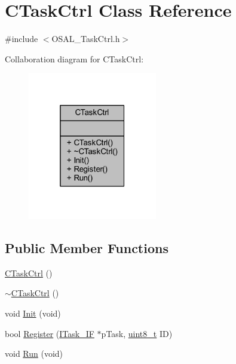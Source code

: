 \hypertarget{class_c_task_ctrl}{}\section{C\+Task\+Ctrl Class Reference}
\label{class_c_task_ctrl}


{\ttfamily \#include $<$O\+S\+A\+L\+\_\+\+Task\+Ctrl.\+h$>$}



Collaboration diagram for C\+Task\+Ctrl\+:\nopagebreak
\begin{figure}[H]
\begin{center}
\leavevmode
\includegraphics[width=160pt]{class_c_task_ctrl__coll__graph}
\end{center}
\end{figure}
\subsection*{Public Member Functions}
\begin{DoxyCompactItemize}
\item 
\mbox{\hyperlink{class_c_task_ctrl_a4d459479b49c5d6e1d07e9306748abe3}{C\+Task\+Ctrl}} ()
\item 
\mbox{\hyperlink{class_c_task_ctrl_a525a2b4438270d4ea5fce41e646c5b17}{$\sim$\+C\+Task\+Ctrl}} ()
\item 
void \mbox{\hyperlink{class_c_task_ctrl_a12ec6e8d4a490eba9ebdf22d32cf292b}{Init}} (void)
\item 
bool \mbox{\hyperlink{class_c_task_ctrl_a20457bd4d4a033c8aeeb44e9d4dc3c7c}{Register}} (\mbox{\hyperlink{class_i_task___i_f}{I\+Task\+\_\+\+IF}} $\ast$p\+Task, \mbox{\hyperlink{_a_d_a_s___types_8h_aba7bc1797add20fe3efdf37ced1182c5}{uint8\+\_\+t}} ID)
\item 
void \mbox{\hyperlink{class_c_task_ctrl_ab36ffef43b3bd33303ed7d068b2e89cf}{Run}} (void)
\end{DoxyCompactItemize}


